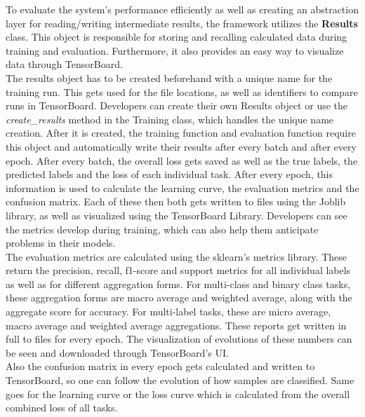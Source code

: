 To evaluate the system's performance efficiently as well as creating an abstraction layer for reading/writing intermediate results, the framework utilizes the \textbf{Results} class. This object is responsible for storing and recalling calculated data during training and evaluation. Furthermore, it also provides an easy way to visualize data through TensorBoard. \\

The results object has to be created beforehand with a unique name for the training run. This gets used for the file locations, as well as identifiers to compare runs in TensorBoard. Developers can create their own Results object or use the \textit{create\_results} method in the Training class, which handles the unique name creation. After it is created, the training function and evaluation function require this object and automatically write their results after every batch and after every epoch. After every batch, the overall loss gets saved as well as the true labels, the predicted labels and the loss of each individual task. After every epoch, this information is used to calculate the learning curve, the evaluation metrics and the confusion matrix. Each of these then both gets written to files using the Joblib library, as well as visualized using the TensorBoard Library. Developers can see the metrics develop during training, which can also help them anticipate problems in their models. \\

The evaluation metrics are calculated using the sklearn's metrics library. These return the precision, recall, f1-score and support metrics for all individual labels as well as for different aggregation forms. For multi-class and binary class tasks, these aggregation forms are macro average and weighted average, along with the aggregate score for accuracy. For multi-label tasks, these are micro average, macro average and weighted average aggregations. These reports get written in full to files for every epoch. The visualization of evolutions of these numbers can be seen and downloaded through TensorBoard's UI. \\

Also the confusion matrix in every epoch gets calculated and written to TensorBoard, so one can follow the evolution of how samples are classified. Same goes for the learning curve or the loss curve which is calculated from the overall combined loss of all tasks. \\

